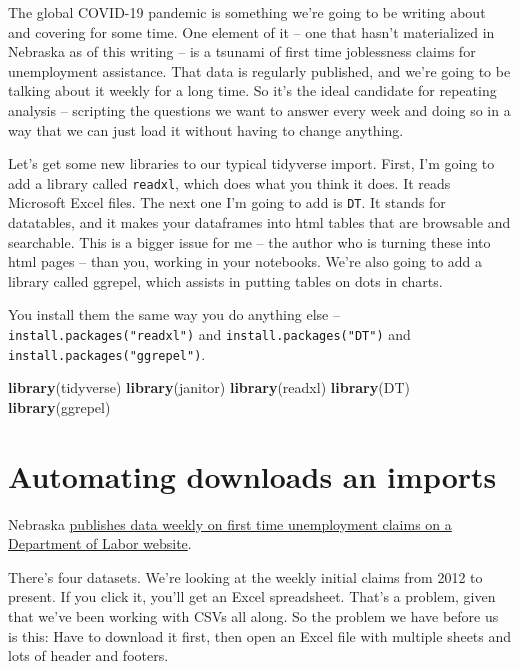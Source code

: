 \documentclass[]{book}
\newenvironment{Shaded}{\begin{snugshade}}{\end{snugshade}}
\newcommand{\KeywordTok}[1]{\textcolor[rgb]{0.13,0.29,0.53}{\textbf{#1}}}
\newcommand{\NormalTok}[1]{#1}
\begin{document}
The global COVID-19 pandemic is something we're going to be writing about and covering for some time. One element of it -- one that hasn't materialized in Nebraska as of this writing -- is a tsunami of first time joblessness claims for unemployment assistance. That data is regularly published, and we're going to be talking about it weekly for a long time. So it's the ideal candidate for repeating analysis -- scripting the questions we want to answer every week and doing so in a way that we can just load it without having to change anything.

Let's get some new libraries to our typical tidyverse import. First, I'm going to add a library called \texttt{readxl}, which does what you think it does. It reads Microsoft Excel files. The next one I'm going to add is \texttt{DT}. It stands for datatables, and it makes your dataframes into html tables that are browsable and searchable. This is a bigger issue for me -- the author who is turning these into html pages -- than you, working in your notebooks. We're also going to add a library called ggrepel, which assists in putting tables on dots in charts.

You install them the same way you do anything else -- \texttt{install.packages("readxl")} and \texttt{install.packages("DT")} and \texttt{install.packages("ggrepel")}.

\begin{Shaded}
\begin{Highlighting}[]
\KeywordTok{library}\NormalTok{(tidyverse)}
\KeywordTok{library}\NormalTok{(janitor)}
\KeywordTok{library}\NormalTok{(readxl)}
\KeywordTok{library}\NormalTok{(DT)}
\KeywordTok{library}\NormalTok{(ggrepel)}
\end{Highlighting}
\end{Shaded}

\hypertarget{automating-downloads-an-imports}{%
\section{Automating downloads an imports}\label{automating-downloads-an-imports}}

Nebraska \href{https://neworks.nebraska.gov/gsipub/index.asp?docid=710}{publishes data weekly on first time unemployment claims on a Department of Labor website}.

There's four datasets. We're looking at the weekly initial claims from 2012 to present. If you click it, you'll get an Excel spreadsheet. That's a problem, given that we've been working with CSVs all along. So the problem we have before us is this: Have to download it first, then open an Excel file with multiple sheets and lots of header and footers.
\end{document}
